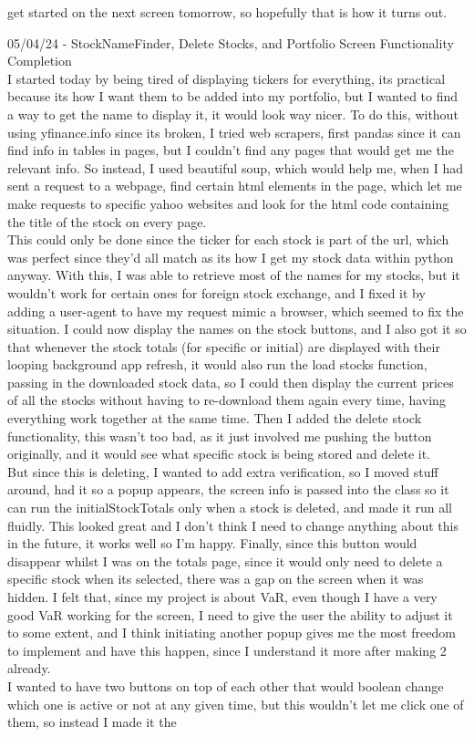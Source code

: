 \documentclass{article}
\begin{document}
get started on the next screen tomorrow, so hopefully that is how it turns out.\\\vspace{0.3cm}

05/04/24 - StockNameFinder, Delete Stocks, and Portfolio Screen Functionality Completion\\
I started today by being tired of displaying tickers for everything, its practical because its how I want them to be added into my portfolio, but I wanted to find a way to get the name to display it, it would look way nicer. To do this, without using yfinance.info since its broken, I tried web scrapers, first pandas since it can find info in tables in pages, but I couldn't find any pages that would get me the relevant info. So instead, I used beautiful soup, which would help me, when I had sent a request to a webpage, find certain html elements in the page, which let me make requests to specific yahoo websites and look for the html code containing the title of the stock on every page. \\This could only be done since the ticker for each stock is part of the url, which was perfect since they'd all match as its how I get my stock data within python anyway. With this, I was able to retrieve most of the names for my stocks, but it wouldn't work for certain ones for foreign stock exchange, and I fixed it by adding a user-agent to have my request mimic a browser, which seemed to fix the situation. I could now display the names on the stock buttons, and I also got it so that whenever the stock totals (for specific or initial) are displayed with their looping background app refresh, it would also run the load stocks function, passing in the downloaded stock data, so I could then display the current prices of all the stocks without having to re-download them again every time, having everything work together at the same time. Then I added the delete stock functionality, this wasn't too bad, as it just involved me pushing the button originally, and it would see what specific stock is being stored and delete it. \\But since this is deleting, I wanted to add extra verification, so I moved stuff around, had it so a popup appears, the screen info is passed into the class so it can run the initialStockTotals only when a stock is deleted, and made it run all fluidly. This looked great and I don't think I need to change anything about this in the future, it works well so I'm happy. Finally, since this button would disappear whilst I was on the totals page, since it would only need to delete a specific stock when its selected, there was a gap on the screen when it was hidden. I felt that, since my project is about VaR, even though I have a very good VaR working for the screen, I need to give the user the ability to adjust it to some extent, and I think initiating another popup gives me the most freedom to implement and have this happen, since I understand it more after making 2 already. \\I wanted to have two buttons on top of each other that would boolean change which one is active or not at any given time, but this wouldn't let me click one of them, so instead I made it the 
\end{document}
